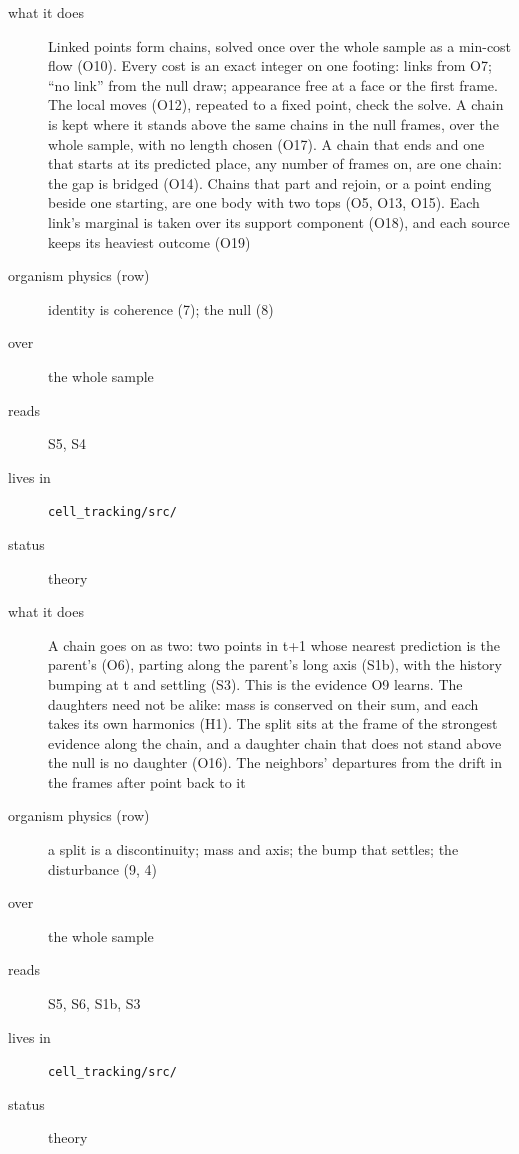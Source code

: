 \begin{description}
\item[{what it does}] Linked points form chains, solved once over the whole sample as a min-cost flow (O10). Every cost is an exact integer on one footing: links from O7; “no link” from the null draw; appearance free at a face or the first frame. The local moves (O12), repeated to a fixed point, check the solve. A chain is kept where it stands above the same chains in the null frames, over the whole sample, with no length chosen (O17). A chain that ends and one that starts at its predicted place, any number of frames on, are one chain: the gap is bridged (O14). Chains that part and rejoin, or a point ending beside one starting, are one body with two tops (O5, O13, O15). Each link's marginal is taken over its support component (O18), and each source keeps its heaviest outcome (O19)
\item[{organism physics (row)}] identity is coherence (7); the null (8)
\item[{over}] the whole sample
\item[{reads}] S5, S4
\item[{lives in}] \texttt{cell\_\allowbreak{}tracking/\allowbreak{}src/\allowbreak{}}
\item[{status}] theory
\end{description}

\begin{description}
\item[{what it does}] A chain goes on as two: two points in t+1 whose nearest prediction is the parent's (O6), parting along the parent's long axis (S1b), with the history bumping at t and settling (S3). This is the evidence O9 learns. The daughters need not be alike: mass is conserved on their sum, and each takes its own harmonics (H1). The split sits at the frame of the strongest evidence along the chain, and a daughter chain that does not stand above the null is no daughter (O16). The neighbors' departures from the drift in the frames after point back to it
\item[{organism physics (row)}] a split is a discontinuity; mass and axis; the bump that settles; the disturbance (9, 4)
\item[{over}] the whole sample
\item[{reads}] S5, S6, S1b, S3
\item[{lives in}] \texttt{cell\_\allowbreak{}tracking/\allowbreak{}src/\allowbreak{}}
\item[{status}] theory
\end{description}


